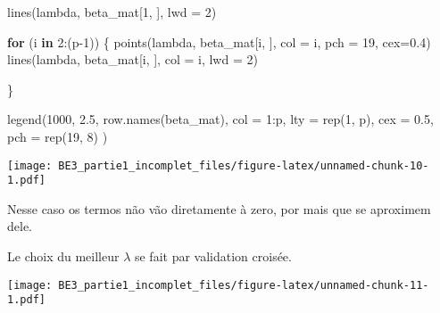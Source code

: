 \documentclass[
]{article}
\newenvironment{Shaded}{\begin{snugshade}}{\end{snugshade}}
\newcommand{\AttributeTok}[1]{\textcolor[rgb]{0.77,0.63,0.00}{#1}}
\newcommand{\CommentTok}[1]{\textcolor[rgb]{0.56,0.35,0.01}{\textit{#1}}}
\newcommand{\ControlFlowTok}[1]{\textcolor[rgb]{0.13,0.29,0.53}{\textbf{#1}}}
\newcommand{\DecValTok}[1]{\textcolor[rgb]{0.00,0.00,0.81}{#1}}
\newcommand{\FloatTok}[1]{\textcolor[rgb]{0.00,0.00,0.81}{#1}}
\newcommand{\FunctionTok}[1]{\textcolor[rgb]{0.00,0.00,0.00}{#1}}
\newcommand{\NormalTok}[1]{#1}
\newcommand{\SpecialCharTok}[1]{\textcolor[rgb]{0.00,0.00,0.00}{#1}}
\newcommand{\StringTok}[1]{\textcolor[rgb]{0.31,0.60,0.02}{#1}}
\begin{document}
\begin{Shaded}
\begin{Highlighting}[]
\FunctionTok{lines}\NormalTok{(lambda, beta\_mat[}\DecValTok{1}\NormalTok{, ], }\AttributeTok{lwd =} \DecValTok{2}\NormalTok{)}

\ControlFlowTok{for}\NormalTok{ (i }\ControlFlowTok{in} \DecValTok{2}\SpecialCharTok{:}\NormalTok{(p}\DecValTok{{-}1}\NormalTok{))}
\NormalTok{\{}
  \FunctionTok{points}\NormalTok{(lambda, beta\_mat[i, ], }\AttributeTok{col =}\NormalTok{ i, }\AttributeTok{pch =} \DecValTok{19}\NormalTok{, }\AttributeTok{cex=}\FloatTok{0.4}\NormalTok{)}
  \FunctionTok{lines}\NormalTok{(lambda, beta\_mat[i, ], }\AttributeTok{col =}\NormalTok{ i, }\AttributeTok{lwd =} \DecValTok{2}\NormalTok{)}
  
\NormalTok{\}}

\FunctionTok{legend}\NormalTok{(}\DecValTok{1000}\NormalTok{, }\FloatTok{2.5}\NormalTok{, }\FunctionTok{row.names}\NormalTok{(beta\_mat),}
       \AttributeTok{col =} \DecValTok{1}\SpecialCharTok{:}\NormalTok{p, }\AttributeTok{lty =} \FunctionTok{rep}\NormalTok{(}\DecValTok{1}\NormalTok{, p), }\AttributeTok{cex =} \FloatTok{0.5}\NormalTok{, }\AttributeTok{pch =}  \FunctionTok{rep}\NormalTok{(}\DecValTok{19}\NormalTok{, }\DecValTok{8}\NormalTok{)}
\NormalTok{)}
\end{Highlighting}
\end{Shaded}

\texttt{[image: BE3\_partie1\_incomplet\_files/figure-latex/unnamed-chunk-10-1.pdf]}

Nesse caso os termos não vão diretamente à zero, por mais que se
aproximem dele.

Le choix du meilleur \(\lambda\) se fait par validation croisée.

\begin{Shaded}
\end{Shaded}

\texttt{[image: BE3\_partie1\_incomplet\_files/figure-latex/unnamed-chunk-11-1.pdf]}

\begin{Shaded}
\end{Shaded}
\end{document}
